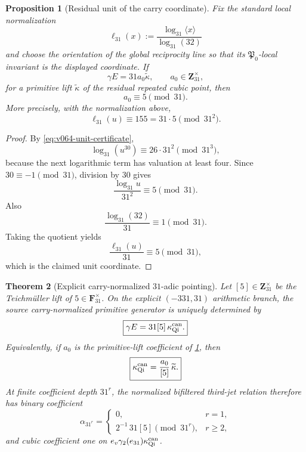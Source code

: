 \documentclass[11pt]{article}
\newtheorem{theorem}{Theorem}[section]
\newtheorem{proposition}[theorem]{Proposition}
\theoremstyle{remark}
\begin{document}
\begin{proposition}[Residual unit of the carry coordinate]
\label{prop:v064-carry-unit-five}
Fix the standard local normalization
\begin{equation}
 \ell_{31}(x)
 :=\frac{\log_{31}\langle x\rangle}{\log_{31}(32)}
 \label{eq:v064-standard-cyclotomic-coordinate}
\end{equation}
and choose the orientation of the global reciprocity line so that its
\(\mathfrak P_0\)-local invariant is the displayed coordinate.  If
\[
 \gamma E=31a_0\widetilde\kappa,
 \qquad
 a_0\in\mathbf Z_{31}^{\times},
\]
for a primitive lift \(\widetilde\kappa\) of the residual repeated cubic
point, then
\begin{equation}
 \boxed{a_0\equiv5\pmod{31}.}
 \label{eq:v064-a0-five}
\end{equation}
More precisely, with the normalization above,
\begin{equation}
 \ell_{31}(u)\equiv155=31\cdot5\pmod{31^2}.
 \label{eq:v064-log-coordinate-mod31sq}
\end{equation}
\end{proposition}

\begin{proof}
By \eqref{eq:v064-unit-certificate},
\[
 \log_{31}(u^{30})
 \equiv26\cdot31^2\pmod{31^3},
\]
because the next logarithmic term has valuation at least four.  Since
\(30\equiv-1\pmod{31}\), division by \(30\) gives
\[
 \frac{\log_{31}u}{31^2}\equiv5\pmod{31}.
\]
Also
\[
 \frac{\log_{31}(32)}{31}\equiv1\pmod{31}.
\]
Taking the quotient yields
\[
 \frac{\ell_{31}(u)}{31}\equiv5\pmod{31},
\]
which is the claimed unit coordinate.
\end{proof}

\begin{theorem}[Explicit carry-normalized \(31\)-adic pointing]
\label{thm:v064-explicit-carry-pointing}
Let \([5]\in\mathbf Z_{31}^{\times}\) be the Teichm\"uller lift of
\(5\in\mathbf F_{31}^{\times}\).  On the explicit \((-331,31)\) arithmetic
branch, the source carry-normalized primitive generator is uniquely determined
by
\begin{equation}
 \boxed{
 \gamma E
 =31[5]\,\kappa_{\rm Qi}^{\rm can}.}
 \label{eq:v064-canonical-carry}
\end{equation}
Equivalently, if \(a_0\) is the primitive-lift coefficient of
\cref{prop:v064-carry-unit-five}, then
\begin{equation}
 \boxed{
 \kappa_{\rm Qi}^{\rm can}
 =\frac{a_0}{[5]}\,\widetilde\kappa.}
 \label{eq:v064-canonical-kappa}
\end{equation}
At finite coefficient depth \(31^r\), the normalized bifiltered third-jet
relation therefore has binary coefficient
\begin{equation}
 \boxed{
 \alpha_{31^r}
 =
 \begin{cases}
  0,&r=1,\\[1mm]
  2^{-1}\,31[5]\pmod{31^r},&r\ge2,
 \end{cases}}
 \label{eq:v064-finite-carry-coefficient}
\end{equation}
and cubic coefficient one on
\(e_v\gamma_2(e_{31})\kappa_{\rm Qi}^{\rm can}\).
\end{theorem}
\end{document}
